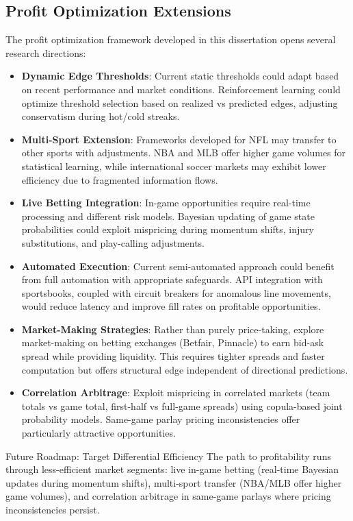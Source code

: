 
\subsection{Profit Optimization Extensions}\label{subsec:profit-optimization-extensions}

The profit optimization framework developed in this dissertation opens several research directions:

\begin{itemize}
  \item \textbf{Dynamic Edge Thresholds}: Current static thresholds could adapt based on recent performance and market conditions. Reinforcement learning could optimize threshold selection based on realized vs predicted edges, adjusting conservatism during hot/cold streaks.

  \item \textbf{Multi-Sport Extension}: Frameworks developed for NFL may transfer to other sports with adjustments. NBA and MLB offer higher game volumes for statistical learning, while international soccer markets may exhibit lower efficiency due to fragmented information flows.

  \item \textbf{Live Betting Integration}: In-game opportunities require real-time processing and different risk models. Bayesian updating of game state probabilities could exploit mispricing during momentum shifts, injury substitutions, and play-calling adjustments.

  \item \textbf{Automated Execution}: Current semi-automated approach could benefit from full automation with appropriate safeguards. API integration with sportsbooks, coupled with circuit breakers for anomalous line movements, would reduce latency and improve fill rates on profitable opportunities.

  \item \textbf{Market-Making Strategies}: Rather than purely price-taking, explore market-making on betting exchanges (Betfair, Pinnacle) to earn bid-ask spread while providing liquidity. This requires tighter spreads and faster computation but offers structural edge independent of directional predictions.

  \item \textbf{Correlation Arbitrage}: Exploit mispricing in correlated markets (team totals vs game total, first-half vs full-game spreads) using copula-based joint probability models. Same-game parlay pricing inconsistencies offer particularly attractive opportunities.
\end{itemize}

\begin{keyfinding}{Future Roadmap: Target Differential Efficiency}
The path to profitability runs through less-efficient market segments: live in-game betting (real-time Bayesian updates during momentum shifts), multi-sport transfer (NBA/MLB offer higher game volumes), and correlation arbitrage in same-game parlays where pricing inconsistencies persist.
\end{keyfinding}
